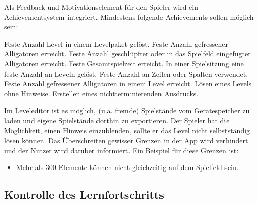 \begin{requirements}
	Als Feedback und Motivationselement für den Spieler wird ein Achievementsystem integriert.
	Mindestens folgende Achievements sollen möglich sein:
		\begin{requirements}
			 Feste Anzahl Level in einem Levelpaket gelöst.
			 Feste Anzahl gefressener Alligatoren erreicht.
			 Feste Anzahl geschlüpfter oder in das Spielfeld eingefügter Alligatoren erreicht.
			 Feste Gesamtspielzeit erreicht.
			 In einer Spielsitzung eine feste Anzahl an Leveln gelöst.
			 Feste Anzahl an Zeilen oder Spalten verwendet.
			 Feste Anzahl gefressener Alligatoren in einem Level erreicht.
			 Lösen eines Levels ohne Hinweise.
			 Erstellen eines nichtterminierenden Ausdrucks.
		\end{requirements}
	Im Leveleditor ist es möglich, (u.a. fremde) Spielstände vom Gerätespeicher zu laden und eigene Spielstände dorthin zu exportieren.
	 Der Spieler hat die Möglichkeit, einen Hinweis einzublenden, sollte er das Level nicht selbstständig lösen können.
	 Das Überschreiten gewisser Grenzen in der App wird verhindert und der Nutzer wird darüber informiert. Ein Beispiel für diese Grenzen ist:
	\begin{itemize}
		\item Mehr als 300 Elemente können nicht gleichzeitig auf dem Spielfeld sein.
		
	\end{itemize} 
\end{requirements}
	

\subsection{Kontrolle des Lernfortschritts}

